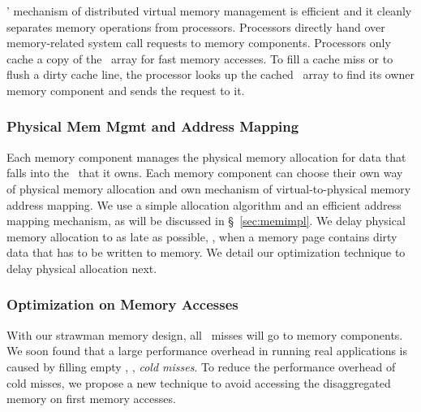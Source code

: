 \documentclass[10pt,times,twocolumn]{z2-article}
\begin{document}
{{{{{{{%
\lego{}' mechanism of distributed virtual memory management is efficient and it cleanly separates memory operations from processors.
Processors directly hand over memory-related system call requests to memory components.
Processors only cache a copy of the \vregion\ array for fast memory accesses.
To fill a cache miss or to flush a dirty cache line, 
the processor looks up the cached \vregion\ array to find its owner memory component and sends the request to it.






\subsubsection{Physical Mem Mgmt and Address Mapping}
Each memory component manages the physical memory allocation for data that falls into the
\vregion\ that it owns.
Each memory component can choose their own way of physical memory allocation
and own mechanism of virtual-to-physical memory address mapping.
We use a simple allocation algorithm and an efficient address mapping mechanism, 
as will be discussed in \S~\ref{sec:memimpl}.
We delay physical memory allocation to as late as possible, 
\ie, when a memory page contains dirty data that has to be written to memory.
We detail our optimization technique to delay physical allocation next.

\subsubsection{Optimization on Memory Accesses}
\label{sec:zerofill}
With our strawman memory design, 
all \excache\ misses will go to memory components.
We soon found that a large performance overhead in running real applications 
is caused by filling empty \excache, \ie, {\em cold misses}.
To reduce the performance overhead of cold misses, we propose a new technique 
to avoid accessing the disaggregated memory on first memory accesses.

}}}}}}}
\end{document}
